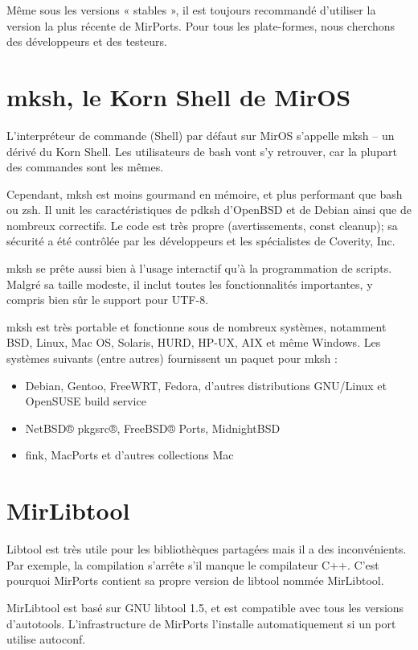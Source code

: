 \documentclass[a4paper,landscape,11pt,notumble]{leaflet}
\begin{document}
Même sous les versions « stables », il est toujours recommandé d’utiliser la version la plus récente de MirPorts. Pour tous les plate-formes, nous cherchons des développeurs et des testeurs.

\newpage

\section{mksh, le Korn Shell de MirOS}

L’interpréteur de commande (Shell) par défaut sur MirOS s’appelle mksh – un dérivé du Korn Shell. Les utilisateurs de bash vont s’y retrouver, car la plupart des commandes sont les mêmes.

Cependant, mksh est moins gourmand en mémoire, et plus performant que bash ou zsh. Il unit les caractéristiques de pdksh d’OpenBSD et de Debian ainsi que de nombreux correctifs. Le code est très propre (avertissements, const cleanup); sa sécurité a été contrôlée par les développeurs et les spécialistes de Coverity, Inc.

mksh se prête aussi bien à l’usage interactif qu’à la programmation de scripts. Malgré sa taille modeste, il inclut toutes les fonctionnalités importantes, y compris bien sûr le support pour UTF-8.

mksh est très portable et fonctionne sous de nombreux systèmes, notamment BSD, Linux, Mac OS, Solaris, HURD, HP-UX, AIX et même Windows. Les systèmes suivants (entre autres) fournissent un paquet pour mksh :

\begin{itemize}
\item Debian, Gentoo, FreeWRT, Fedora, d’autres distributions GNU/Linux et OpenSUSE build service
\item NetBSD® pkgsrc®, FreeBSD® Ports, MidnightBSD
\item fink, MacPorts et d’autres collections Mac
\end{itemize}

\section{MirLibtool}

Libtool est très utile pour les bibliothèques partagées mais il a des inconvénients. Par exemple, la compilation s’arrête s’il manque le compilateur C++. C’est pourquoi MirPorts contient sa propre version de libtool nommée MirLibtool.

MirLibtool est basé sur GNU libtool 1.5, et est compatible avec tous les versions d’autotools. L’infrastructure de MirPorts l’installe automatiquement  si un port utilise autoconf.
\end{document}
